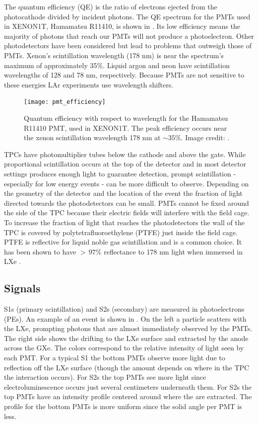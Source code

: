 The quantum efficiency (QE) is the ratio of electrons ejected from the photocathode divided by incident photons.  The QE spectrum for
the PMTs used in XENON1T, Hamamatsu R11410, is shown in .  Its low efficiency means the majority of photons that
reach our PMTs will not produce a photoelectron.  Other photodetectors have been considered but lead to problems that outweigh those
of PMTs.  Xenon's scintillation wavelength (178 nm) is near the spectrum's maximum of approximately 35\%.  Liquid argon and neon have
scintillation wavelengths of 128 and 78 nm, respectively.  Because PMTs are not sensitive to these energies LAr experiments use
wavelength shifters.

\begin{figure}
\centering
\texttt{[image: pmt\_efficiency]}
\caption{Quantum efficiency with respect to wavelength for the Hamamatsu R11410 PMT, used in XENON1T.  The peak efficiency occurs near
the xenon scintillation wavelength 178 nm at ${\sim} 35 \%$.  Image credit: .}
\label{fig:tpcs_pmts_qe}
\end{figure}

TPCs have photomultiplier tubes below the cathode and above the gate.  While proportional scintillation occurs at the top of the detector
and in most detector settings produces enough light to guarantee detection, prompt scintillation - especially for low energy events - can
be more difficult to observe.  Depending on the geometry of the detector and the location of the event the fraction of light
directed towards the photodetectors can
be small.  PMTs cannot be fixed around the side of the TPC because their electric fields will interfere with the field
cage.  To increase
the fraction of light that reaches the photodetectors the wall of the TPC is covered by polytetrafluoroethylene (PTFE) just inside the
field cage.  PTFE is reflective for liquid noble gas scintillation and is a common choice.  It has been shown to have ${>}\, 97 \%$
reflectance to 178 nm light when immersed in LXe .



\subsection{Signals}
\label{subsec:tpcs_signals}
S1s (primary scintillation) and S2s (secondary) are measured in photoelectrons (PEs).  An example of an
event is shown in .  On the left a particle scatters with the LXe, prompting photons that are almost
immediately observed by the PMTs.  The right side shows the \electron drifting to the LXe surface and
extracted by the anode across the GXe.  The colors correspond to the relative intensity of light seen by each PMT.  For a typical S1 the
bottom PMTs observe more light due to reflection off the LXe surface (though the amount depends on where in the TPC the interaction
occurs).  For S2s the top PMTs see more light since electroluminescence occurs just several centimeters underneath them.  For S2s
the top PMTs have an intensity profile centered around where the \electron are extracted.  The profile for the bottom PMTs is more
uniform since the solid angle per PMT is less.

